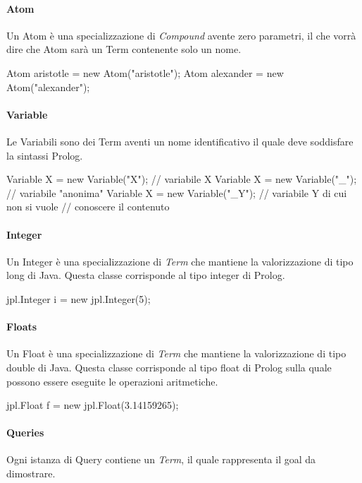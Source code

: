\paragraph{Atom}
Un Atom è una specializzazione di \emph{Compound} avente zero parametri, il che vorrà dire che Atom sarà un Term contenente solo un nome.

\begin{javacode}
	Atom aristotle = new Atom("aristotle");
	Atom alexander = new Atom("alexander");
\end{javacode}

\paragraph{Variable}
Le Variabili sono dei Term aventi un nome identificativo il quale deve soddisfare la sintassi Prolog.

\begin{javacode}
	Variable X = new Variable("X");  //  variabile X
	Variable X = new Variable("_");  //  variabile "anonima"
	Variable X = new Variable("_Y"); // variabile Y di cui non si vuole 
	// conoscere il contenuto
\end{javacode}

\paragraph{Integer}
Un Integer è una specializzazione di \emph{Term} che mantiene la valorizzazione di tipo long di Java. Questa classe corrisponde al tipo integer di Prolog.

\begin{javacode}
	jpl.Integer i = new jpl.Integer(5);
\end{javacode}

\paragraph{Floats}
Un Float è una specializzazione di \emph{Term} che mantiene la valorizzazione di tipo double di Java. Questa classe corrisponde al tipo float di Prolog sulla quale possono essere eseguite le operazioni aritmetiche.

\begin{javacode}
	jpl.Float f = new jpl.Float(3.14159265);
\end{javacode}

\paragraph{Queries}
Ogni istanza di Query contiene un \emph{Term}, il quale rappresenta il goal da dimostrare.

